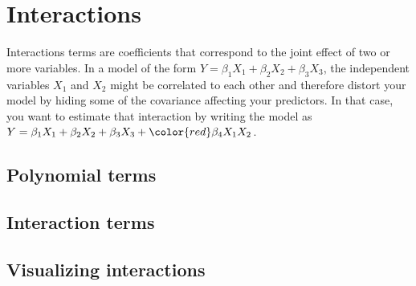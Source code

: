 %
%
%
\section{Interactions}

	Interactions terms are coefficients that correspond to the joint effect of two or more variables. In a model of the form $Y = \beta_1 X_1 + \beta_2 X_2 + \beta_3 X_3$, the independent variables $X_1$ and $X_2$ might be correlated to each other and therefore distort your model by hiding some of the covariance affecting your predictors. In that case, you want to estimate that interaction by writing the model as $Y = \beta_1 X_1 + \beta_2 X_2 + \beta_3 X_3 +  {\color{red}\beta_4 X_1X_2}$.%

	\subsection{Polynomial terms}

	\subsection{Interaction terms}

	\subsection{Visualizing interactions}

